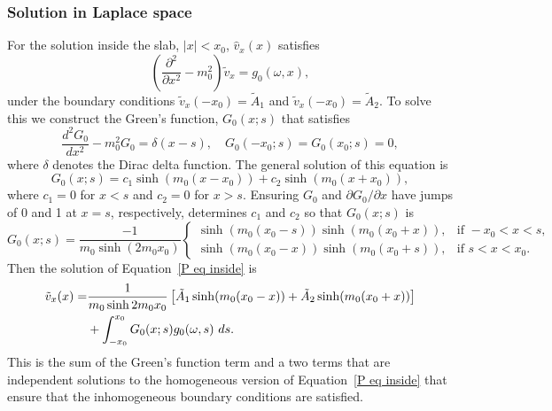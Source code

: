 \documentclass[12pt]{../style-files/ociamthesis}
\begin{document}
\subsubsection{Solution in Laplace space}

For the solution inside the slab, $|x| < x_0$, $\hat{v}_x(x)$ satisfies
\begin{equation}
\left( \frac{\partial^2}{\partial x^2} - m_0^2 \right) \tilde{v}_x = g_0(\omega, x),
\end{equation}
under the boundary conditions $\tilde{v}_x(-x_0) = \tilde{A}_1$ and $\tilde{v}_x(-x_0) = \tilde{A}_2$. To solve this we construct the Green's function, $G_0(x;s)$ that satisfies
\begin{equation}
\frac{d^2G_0}{dx^2} - m_0^2 G_0 = \delta(x-s), \quad G_0(-x_0;s) = G_0(x_0;s) = 0,
\end{equation}
where $\delta$ denotes the Dirac delta function. The general solution of this equation is
\begin{equation}
G_0(x;s) = c_1\sinh(m_0(x - x_0)) + c_2\sinh(m_0(x + x_0)),
\end{equation}
where $c_1 = 0$ for $x < s$ and $c_2 = 0$ for $x > s$. Ensuring $G_0$ and $\partial G_0 / \partial x$ have jumps of 0 and 1 at $x = s$, respectively, determines $c_1$ and $c_2$ so that $G_0(x;s)$ is
\begin{equation}
G_0(x;s) = \frac{-1}{m_0\sinh(2m_0 x_0)}
\begin{cases}
\sinh(m_0(x_0 - s))\sinh(m_0(x_0 + x)), & \text{if } -x_0<x<s, \\
\sinh(m_0(x_0 - x))\sinh(m_0(x_0 + s)), & \text{if } s<x<x_0.
\end{cases}
\end{equation}
Then the solution of Equation~\eqref{P eq inside} is
\begin{align}
\tilde{v}_x(x) = &\frac{1}{m_0\sinh{2m_0 x_0}} \left[ \tilde{A}_1\sinh(m_0(x_0 - x)) + \tilde{A}_2\sinh(m_0(x_0 + x)) \right] \notag \\
&+ \int_{-x_0}^{x_0} G_0(x;s) g_0(\omega, s) ~ds.
\label{V sol 0}
\end{align}
This is the sum of the Green's function term and a two terms that are independent solutions to the homogeneous version of Equation~\eqref{P eq inside} that ensure that the inhomogeneous boundary conditions are satisfied.
\end{document}

